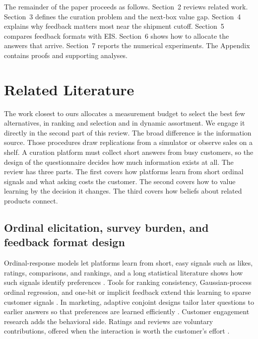 \documentclass[11pt]{article}
\theoremstyle{definition}
\theoremstyle{remark}
\newcommand{\1}{\mathbf{1}}
\begin{document}
The remainder of the paper proceeds as follows. Section~2 reviews related
work. Section~3 defines the curation problem and the next-box value gap.
Section~4 explains why feedback matters most near the shipment cutoff.
Section~5 compares feedback formats with EIS. Section~6 shows how to
allocate the answers that arrive. Section~7 reports the numerical
experiments. The Appendix contains proofs and supporting analyses.

\section{Related Literature}
\label{sec:lit}

The work closest to ours allocates a measurement budget to select the
best few alternatives, in ranking and selection and in dynamic
assortment. We engage it directly in the second part of this review.
The broad difference is the information source. Those procedures draw
replications from a simulator or observe sales on a shelf. A curation
platform must collect short answers from busy customers, so the design
of the questionnaire decides how much information exists at all. The
review has three parts. The first covers how platforms learn from short
ordinal signals and what asking costs the customer. The second covers
how to value learning by the decision it changes. The third covers
how beliefs about related products connect.

\subsection{Ordinal elicitation, survey burden, and feedback format design}

Ordinal-response models let platforms learn from short, easy signals such
as likes, ratings, comparisons, and rankings, and a long statistical
literature shows how such signals identify preferences
\citep{BradleyTerry,Plackett,Luce,McCullagh,Agresti,Hunter,CaronDoucet,GuiverSnelson}.
Tools for ranking consistency, Gaussian-process ordinal regression,
and one-bit or implicit feedback extend this learning to sparse
customer signals
\citep{NegahbanOhShah2012,MaystreGrossglauser2015,ChuGhahramani2005,Joachims2002,HuKorenVolinsky2008}.
In marketing, adaptive conjoint designs tailor later questions to
earlier answers so that preferences are learned efficiently
\citep{ToubiaHauserSimester2004,ToubiaHauserGarcia2007,YuGoosVandebroek2011,SaureVielma2019}.
Customer engagement research adds the behavioral side. Ratings and
reviews are voluntary contributions, offered when the interaction is
worth the customer's effort
\citep{VerhoefReinartzKrafft2010,VanDoornEtAl2010,PansariKumar2017}.
\end{document}
